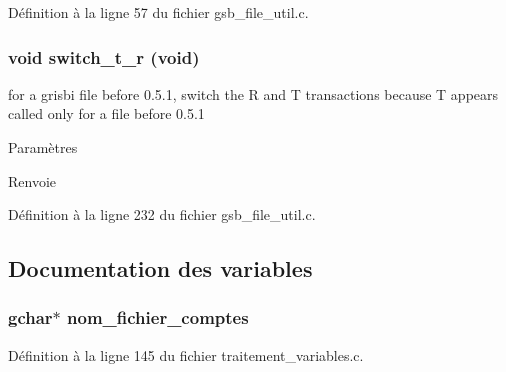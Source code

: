 Définition à la ligne 57 du fichier gsb\_\-file\_\-util.c.

\subsubsection[{switch\_\-t\_\-r}]{\setlength{\rightskip}{0pt plus 5cm}void switch\_\-t\_\-r (void)}\label{gsb__file__util_8c_ae79b0f000a8686ec053bddcd2f0c1d35}
for a grisbi file before 0.5.1, switch the R and T transactions because T appears called only for a file before 0.5.1


\begin{DoxyParams}{Paramètres}
\item[{\em }]\end{DoxyParams}
\begin{DoxyReturn}{Renvoie}

\end{DoxyReturn}


Définition à la ligne 232 du fichier gsb\_\-file\_\-util.c.



\subsection{Documentation des variables}
\subsubsection[{nom\_\-fichier\_\-comptes}]{\setlength{\rightskip}{0pt plus 5cm}gchar$\ast$ {\bf nom\_\-fichier\_\-comptes}}\label{gsb__file__util_8c_ae00b9af94c75169e6ab8cf0ec25e8b89}


Définition à la ligne 145 du fichier traitement\_\-variables.c.

